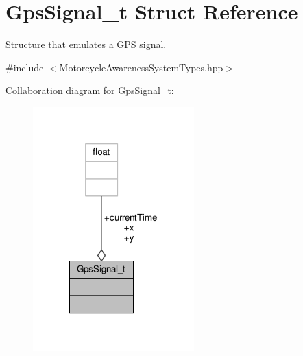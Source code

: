 \hypertarget{structGpsSignal__t}{\section{Gps\-Signal\-\_\-t Struct Reference}
\label{structGpsSignal__t}
}


Structure that emulates a G\-P\-S signal.  




{\ttfamily \#include $<$Motorcycle\-Awareness\-System\-Types.\-hpp$>$}



Collaboration diagram for Gps\-Signal\-\_\-t\-:\nopagebreak
\begin{figure}[H]
\begin{center}
\leavevmode
\includegraphics[width=176pt]{structGpsSignal__t__coll__graph}
\end{center}
\end{figure}

